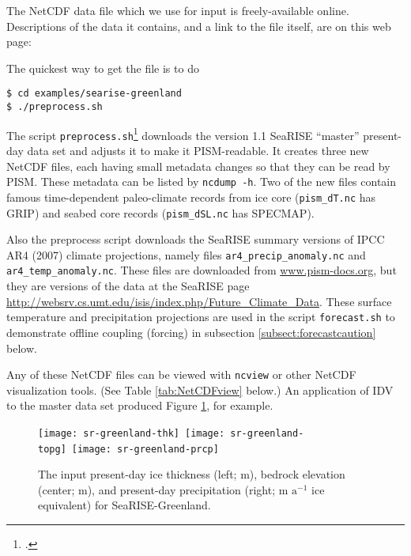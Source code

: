 The NetCDF data file which we use for input is freely-available online.  Descriptions of the data it contains, and a link to the file itself, are on this web page: 
\medskip

\centerline{}
\medskip

\noindent The quickest way to get the file is to do
\begin{verbatim}
$ cd examples/searise-greenland
$ ./preprocess.sh
\end{verbatim}
\noindent The script \texttt{preprocess.sh}\footnote{.} downloads the version 1.1 SeaRISE ``master'' present-day data set and adjusts it to make it PISM-readable.  It creates three new NetCDF files, each having small metadata changes so that they can be read by PISM.  These metadata can be listed by \texttt{ncdump -h}.  Two of the new files contain famous time-dependent paleo-climate records from ice core (\texttt{pism_dT.nc} has GRIP) and seabed core records (\texttt{pism_dSL.nc} has SPECMAP).

Also the preprocess script downloads the SeaRISE summary versions of IPCC AR4 (2007) climate projections, namely files \texttt{ar4_precip_anomaly.nc} and \texttt{ar4_temp_anomaly.nc}.  These files are downloaded from \href{http://www.pism-docs.org/}{www.pism-docs.org}, but they are versions of the data at the SeaRISE page \url{http://websrv.cs.umt.edu/isis/index.php/Future_Climate_Data}.  These surface temperature and precipitation projections  are used in the script \texttt{forecast.sh} to demonstrate offline coupling (forcing) in subsection \ref{subsect:forecastcaution} below.

Any of these NetCDF files can be viewed with \texttt{ncview} or other NetCDF visualization tools.  (See Table \ref{tab:NetCDFview} below.)  An application of IDV to the master data set produced Figure \ref{fig:sr-input}, for example.

\begin{figure}[ht]
\centering
\mbox{\texttt{[image: sr-greenland-thk]}
  \qquad
  \texttt{[image: sr-greenland-topg]}
  \qquad
  \texttt{[image: sr-greenland-prcp]}}
\caption{The input present-day ice thickness (left; m), bedrock elevation (center; m), and present-day precipitation (right; m $\text{a}^{-1}$ ice equivalent) for SeaRISE-Greenland.}
\label{fig:sr-input}
\end{figure}


